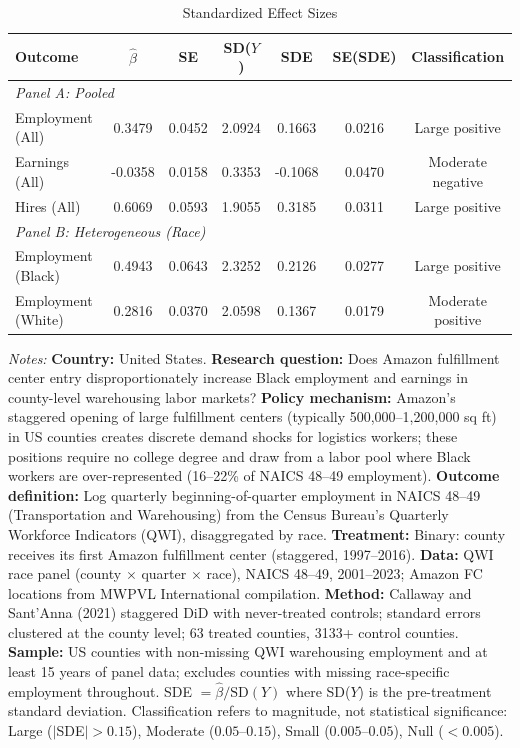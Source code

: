 \begin{table}[t]
\centering
\caption{Standardized Effect Sizes}
\label{tab:sde}
\begin{threeparttable}
\begin{tabular}{lcccccc}
\toprule
Outcome & $\hat{\beta}$ & SE & SD($Y$) & SDE & SE(SDE) & Classification \\
\midrule
\multicolumn{7}{l}{\textit{Panel A: Pooled}} \\[3pt]
Employment (All) & 0.3479 & 0.0452 & 2.0924 & 0.1663 & 0.0216 & Large positive \\
Earnings (All) & -0.0358 & 0.0158 & 0.3353 & -0.1068 & 0.0470 & Moderate negative \\
Hires (All) & 0.6069 & 0.0593 & 1.9055 & 0.3185 & 0.0311 & Large positive \\[6pt]
\multicolumn{7}{l}{\textit{Panel B: Heterogeneous (Race)}} \\[3pt]
Employment (Black) & 0.4943 & 0.0643 & 2.3252 & 0.2126 & 0.0277 & Large positive \\
Employment (White) & 0.2816 & 0.0370 & 2.0598 & 0.1367 & 0.0179 & Moderate positive \\
\bottomrule
\end{tabular}
\begin{tablenotes}[flushleft]
\small
\item \textit{Notes:} \textbf{Country:} United States. \textbf{Research question:} Does Amazon fulfillment center entry disproportionately increase Black employment and earnings in county-level warehousing labor markets? \textbf{Policy mechanism:} Amazon's staggered opening of large fulfillment centers (typically 500,000--1,200,000 sq ft) in US counties creates discrete demand shocks for logistics workers; these positions require no college degree and draw from a labor pool where Black workers are over-represented (16--22\% of NAICS 48--49 employment). \textbf{Outcome definition:} Log quarterly beginning-of-quarter employment in NAICS 48--49 (Transportation and Warehousing) from the Census Bureau's Quarterly Workforce Indicators (QWI), disaggregated by race. \textbf{Treatment:} Binary: county receives its first Amazon fulfillment center (staggered, 1997--2016). \textbf{Data:} QWI race panel (county $\times$ quarter $\times$ race), NAICS 48--49, 2001--2023; Amazon FC locations from MWPVL International compilation. \textbf{Method:} Callaway and Sant'Anna (2021) staggered DiD with never-treated controls; standard errors clustered at the county level; 63 treated counties, 3133+ control counties. \textbf{Sample:} US counties with non-missing QWI warehousing employment and at least 15 years of panel data; excludes counties with missing race-specific employment throughout. SDE $= \hat{\beta} / \text{SD}(Y)$ where SD($Y$) is the pre-treatment standard deviation. Classification refers to magnitude, not statistical significance: Large ($|$SDE$| > 0.15$), Moderate ($0.05$--$0.15$), Small ($0.005$--$0.05$), Null ($< 0.005$).
\end{tablenotes}
\end{threeparttable}
\end{table}
